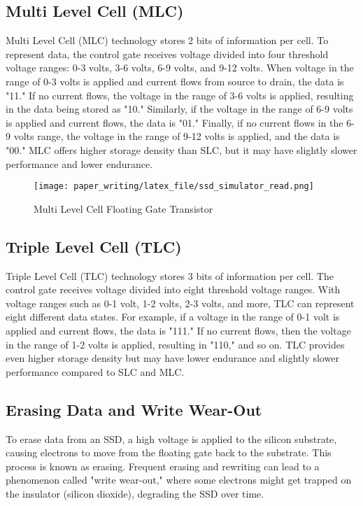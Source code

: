 \documentclass[conference]{paper_writing/latex_file/IEEEtran}
\begin{document}
\subsection{Multi Level Cell (MLC)}
Multi Level Cell (MLC) technology stores 2 bits of information per cell. To represent data, the control gate receives voltage divided into four threshold voltage ranges: 0-3 volts, 3-6 volts, 6-9 volts, and 9-12 volts. When voltage in the range of 0-3 volts is applied and current flows from source to drain, the data is "11." If no current flows, the voltage in the range of 3-6 volts is applied, resulting in the data being stored as "10." Similarly, if the voltage in the range of 6-9 volts is applied and current flows, the data is "01." Finally, if no current flows in the 6-9 volts range, the voltage in the range of 9-12 volts is applied, and the data is "00." MLC offers higher storage density than SLC, but it may have slightly slower performance and lower endurance.
\begin{figure}[h]
    \centering
    \texttt{[image: paper\_writing/latex\_file/ssd\_simulator\_read.png]}
    \caption{Multi Level Cell Floating Gate Transistor}
    \label{fig:ssd_simulator_read}
\end{figure}
\subsection{Triple Level Cell (TLC)}
Triple Level Cell (TLC) technology stores 3 bits of information per cell. The control gate receives voltage divided into eight threshold voltage ranges. With voltage ranges such as 0-1 volt, 1-2 volts, 2-3 volts, and more, TLC can represent eight different data states. For example, if a voltage in the range of 0-1 volt is applied and current flows, the data is "111." If no current flows, then the voltage in the range of 1-2 volts is applied, resulting in "110," and so on. TLC provides even higher storage density but may have lower endurance and slightly slower performance compared to SLC and MLC.

\subsection{Erasing Data and Write Wear-Out}
To erase data from an SSD, a high voltage is applied to the silicon substrate, causing electrons to move from the floating gate back to the substrate. This process is known as erasing. Frequent erasing and rewriting can lead to a phenomenon called "write wear-out," where some electrons might get trapped on the insulator (silicon dioxide), degrading the SSD over time.
\end{document}
